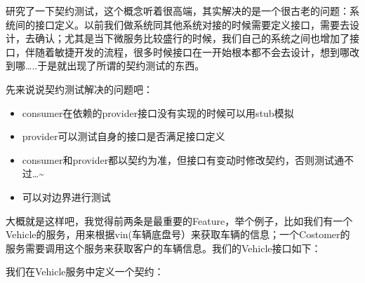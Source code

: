 \documentclass[12pt]{article}
\begin{document}
\makeblogtitle

研究了一下契约测试，这个概念听着很高端，其实解决的是一个很古老的问题：系统间的接口定义。以前我们做系统同其他系统对接的时候需要定义接口，需要去设计，去确认；尤其是当下微服务比较盛行的时候，我们自己的系统之间也增加了接口，伴随着敏捷开发的流程，很多时候接口在一开始根本都不会去设计，想到哪改到哪\ldots..于是就出现了所谓的契约测试的东西。

先来说说契约测试解决的问题吧：

\begin{itemize}
\tightlist
\item
  consumer在依赖的provider接口没有实现的时候可以用stub模拟
\item
  provider可以测试自身的接口是否满足接口定义
\item
  consumer和provider都以契约为准，但接口有变动时修改契约，否则测试通不过\ldots\textasciitilde{}
\item
  可以对边界进行测试
\end{itemize}

大概就是这样吧，我觉得前两条是最重要的Feature，举个例子，比如我们有一个Vehicle的服务，用来根据vin(车辆底盘号）来获取车辆的信息；一个Costomer的服务需要调用这个服务来获取客户的车辆信息。我们的Vehicle接口如下：

\begin{Shaded}
\begin{Highlighting}[]
\OperatorTok{(}\OperatorTok{)}
\OperatorTok{(} \OperatorTok{)\{}
\OperatorTok{=} \OperatorTok{(}\OperatorTok{);}
   \OperatorTok{(}\OperatorTok{==} \OperatorTok{)}
         \OperatorTok{();}
   \OperatorTok{;}
\OperatorTok{\}}
\end{Highlighting}
\end{Shaded}

我们在Vehicle服务中定义一个契约：
\end{document}
